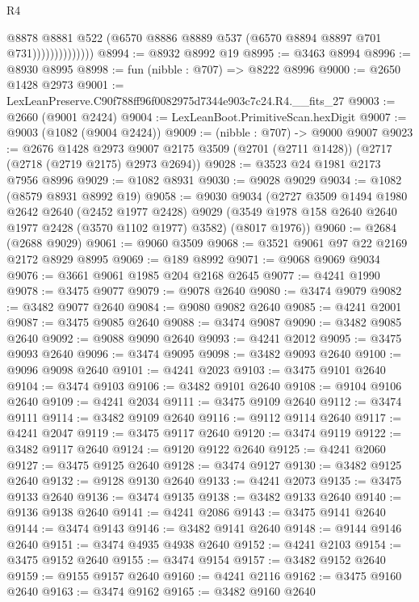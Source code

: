 \begin{lexlean}{R4}
\begin{coremodule}
                            @8878
                            @8881
                            @522
                            (@6570 @8886 @8889 @537 (@6570 @8894 @8897 @701 @731))))))))))))))
@8994 := @8932 @8992 @19
@8995 := @3463 @8994
@8996 := @8930 @8995
@8998 := fun (nibble : @707) => @8222 @8996
@9000 := @2650 @1428 @2973
@9001 := LexLeanPreserve.C90f788ff96f0082975d7344e903c7c24.R4.__fits_27
@9003 := @2660 (@9001 @2424)
@9004 := LexLeanBoot.PrimitiveScan.hexDigit
@9007 := @9003 (@1082 (@9004 @2424))
@9009 := (nibble : @707) -> @9000 @9007
@9023 := @2676
    @1428
    @2973
    @9007
    @2175
    @3509
    (@2701 (@2711 @1428))
    (@2717 (@2718 (@2719 @2175) @2973 @2694))
@9028 := @3523 @24 @1981 @2173 @7956 @8996
@9029 := @1082 @8931
@9030 := @9028 @9029
@9034 := @1082 (@8579 @8931 @8992 @19)
@9058 := @9030
    @9034
    (@2727
      @3509
      @1494
      @1980
      @2642
      @2640
      (@2452 @1977 @2428)
      @9029
      (@3549 @1978 @158 @2640 @2640 @1977 @2428 (@3570 @1102 @1977) @3582)
      (@8017 @1976))
@9060 := @2684 (@2688 @9029)
@9061 := @9060 @3509
@9068 := @3521 @9061 @97 @22 @2169 @2172 @8929 @8995
@9069 := @189 @8992
@9071 := @9068 @9069 @9034
@9076 := @3661 @9061 @1985 @204 @2168 @2645
@9077 := @4241 @1990
@9078 := @3475 @9077
@9079 := @9078 @2640
@9080 := @3474 @9079
@9082 := @3482 @9077 @2640
@9084 := @9080 @9082 @2640
@9085 := @4241 @2001
@9087 := @3475 @9085 @2640
@9088 := @3474 @9087
@9090 := @3482 @9085 @2640
@9092 := @9088 @9090 @2640
@9093 := @4241 @2012
@9095 := @3475 @9093 @2640
@9096 := @3474 @9095
@9098 := @3482 @9093 @2640
@9100 := @9096 @9098 @2640
@9101 := @4241 @2023
@9103 := @3475 @9101 @2640
@9104 := @3474 @9103
@9106 := @3482 @9101 @2640
@9108 := @9104 @9106 @2640
@9109 := @4241 @2034
@9111 := @3475 @9109 @2640
@9112 := @3474 @9111
@9114 := @3482 @9109 @2640
@9116 := @9112 @9114 @2640
@9117 := @4241 @2047
@9119 := @3475 @9117 @2640
@9120 := @3474 @9119
@9122 := @3482 @9117 @2640
@9124 := @9120 @9122 @2640
@9125 := @4241 @2060
@9127 := @3475 @9125 @2640
@9128 := @3474 @9127
@9130 := @3482 @9125 @2640
@9132 := @9128 @9130 @2640
@9133 := @4241 @2073
@9135 := @3475 @9133 @2640
@9136 := @3474 @9135
@9138 := @3482 @9133 @2640
@9140 := @9136 @9138 @2640
@9141 := @4241 @2086
@9143 := @3475 @9141 @2640
@9144 := @3474 @9143
@9146 := @3482 @9141 @2640
@9148 := @9144 @9146 @2640
@9151 := @3474 @4935 @4938 @2640
@9152 := @4241 @2103
@9154 := @3475 @9152 @2640
@9155 := @3474 @9154
@9157 := @3482 @9152 @2640
@9159 := @9155 @9157 @2640
@9160 := @4241 @2116
@9162 := @3475 @9160 @2640
@9163 := @3474 @9162
@9165 := @3482 @9160 @2640

\end{coremodule}
\end{lexlean}
